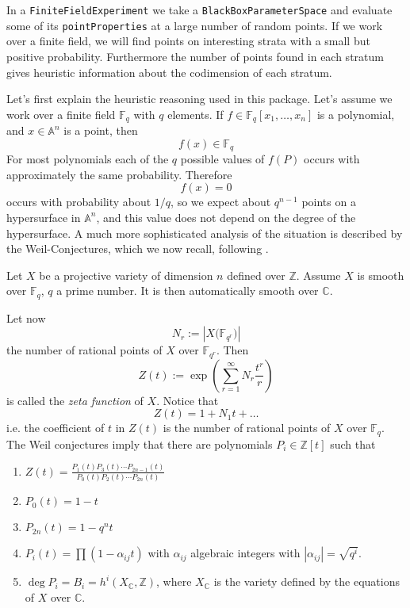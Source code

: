 \documentclass[12pt,a4paper]{amsart}
\theoremstyle{plain}
\theoremstyle{definition}
\newcommand{\FF}{\mathbb F}
\newcommand{\ZZ}{\mathbb Z}
\renewcommand{\AA}{\mathbb A}
\newcommand{\CC}{\mathbb C}
\begin{document}
In a {\tt FiniteFieldExperiment} we take a {\tt BlackBoxParameterSpace} and evaluate some of its {\tt pointProperties} at a large number of random points. If we work over a finite field, we will find points on interesting strata with a small but positive probability. Furthermore the number of points found in each stratum gives heuristic information about the codimension of each stratum.

Let's first explain the heuristic reasoning used in this package. Let's assume we work over a finite field $\FF_q$ with $q$ elements. If $f \in \FF_q[x_1,\dots,x_n]$ is a polynomial, and $x \in \AA^n$ is a point, then
\[
	f(x) \in \FF_q
\]
For most polynomials each of the $q$ possible values of $f(P)$ occurs with approximately the same probability. Therefore 
\[
	f(x) = 0
\]
occurs with probability about $1/q$, so we expect about $q^{n-1}$ points on a hypersurface in $\AA^n$, and this value does not depend on the degree of the hypersurface. A much more sophisticated analysis of the situation is described by the Weil-Conjectures, which we now recall, following \cite[Appendix C]{Hartshorne}.

Let $X$ be a projective variety of dimension $n$ defined over $\ZZ$. Assume $X$ is smooth over $\FF_q$, $q$ a prime number. It is then automatically smooth over $\CC$. 

Let now
\[
	N_r := \left| X\bigl(\FF_{q^r}\bigr) \right|
\]
the number of rational points of $X$ over $\FF_{q^r}$. Then 
\[
	Z(t) := \exp \left( \sum_{r=1}^{\infty} N_r \frac{t^r}{r} \right)
\]
is called the {\sl zeta function} of $X$. Notice that
\[
	Z(t) = 1 + N_1 t + \dots
\]
i.e. the coefficient of $t$ in $Z(t)$ is the number of rational points of $X$ over $\FF_q$.  The Weil conjectures imply that there are polynomials $P_i \in \ZZ[t]$ such that
\begin{enumerate}
\item $Z(t) = \frac{P_1(t) P_3(t) \cdots P_{2n-1}(t)}{P_0(t)P_2(t) \cdots P_{2n}(t)}$
\item $P_0(t) = 1 - t$
\item $P_{2n}(t) = 1 - q^n t$
\item $P_{i}(t) = \prod (1 - \alpha_{ij} t)$ with $\alpha_{ij}$ algebraic integers with $|\alpha_{ij}| = \sqrt{q^i}$.
\item $\deg P_{i} = B_i = h^i(X_{\CC},\ZZ)$, where $X_\CC$ is the variety defined by the equations of $X$ over $\CC$.
\end{enumerate}
\end{document}
